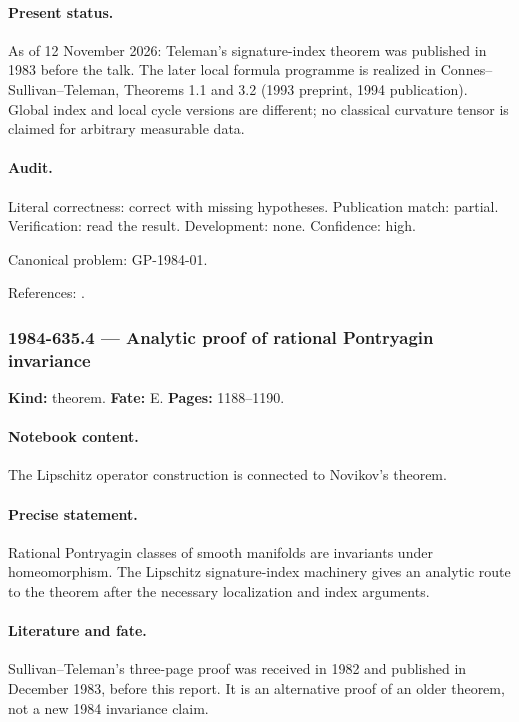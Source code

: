 \paragraph{Present status.} As of 12 November 2026: Teleman's signature-index theorem was published in 1983 before the talk. The later local formula programme is realized in Connes--Sullivan--Teleman, Theorems 1.1 and 3.2 (1993 preprint, 1994 publication). Global index and local cycle versions are different; no classical curvature tensor is claimed for arbitrary measurable data.

\paragraph{Audit.} Literal correctness: correct with missing hypotheses. Publication match: partial. Verification: read the result. Development: none. Confidence: high.

\noindent Canonical problem: GP-1984-01.\par

\noindent References: \citep{teleman1983signature,sullivanteleman1983novikov,connessullivanteleman1994quasiconformal}.\par

\subsubsection{1984-635.4 --- Analytic proof of rational Pontryagin invariance}

\label{item:1984-635.4}

\noindent\textbf{Kind:} theorem. \textbf{Fate:} E. \textbf{Pages:} 1188--1190.\par

\paragraph{Notebook content.} The Lipschitz operator construction is connected to Novikov's theorem.

\paragraph{Precise statement.} Rational Pontryagin classes of smooth manifolds are invariants under homeomorphism. The Lipschitz signature-index machinery gives an analytic route to the theorem after the necessary localization and index arguments.

\paragraph{Literature and fate.} Sullivan--Teleman's three-page proof was received in 1982 and published in December 1983, before this report. It is an alternative proof of an older theorem, not a new 1984 invariance claim.

